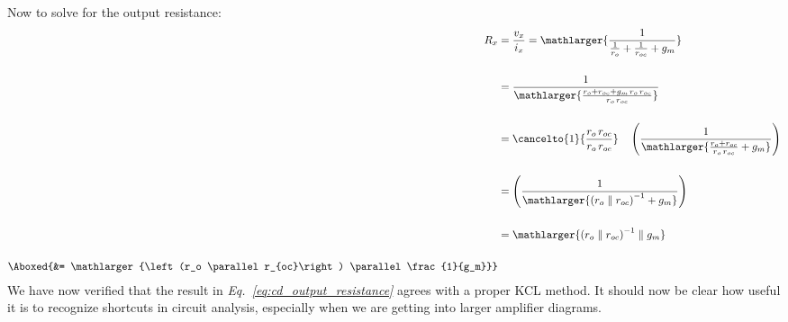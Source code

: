 Now to solve for the output resistance:
    \begin{align}
        R_x &= \frac{v_x}{i_x} = \mathlarger{\frac{1}{\frac{1}{r_o} + \frac{1}{r_{oc}} + g_m}}\\[0.5cm]
        &= \frac{1}{\mathlarger{\frac{r_o + r_{oc} + g_m\,r_o\,r_{oc}}{r_o\,r_{oc}}}}\\[0.5cm]
        &= \cancelto{1}{\frac{r_o\,r_{oc}}{r_o\,r_{oc}}} \quad
                \left( \frac{1}{\mathlarger{\frac{r_o + r_{oc}}{r_o\,r_{oc}} + g_m}} \right)\\[0.5cm]
        &= \left( \frac{1}{\mathlarger{{\left(r_o \parallel r_{oc}\right)}^{-1} + g_m}} \right)\\[0.5cm]
        &= \mathlarger{{\left(r_o \parallel r_{oc}\right)}^{-1} \parallel g_m}\\[0.5cm]
        \Aboxed{&= \mathlarger{\left(r_o \parallel r_{oc}\right) \parallel \frac{1}{g_m}}}
    \end{align}
We have now verified that the result in \emph{Eq.~\ref{eq:cd_output_resistance}} agrees with a proper KCL method.  It should now be clear how useful it is to recognize shortcuts in circuit analysis, especially when we are getting into larger amplifier diagrams.
